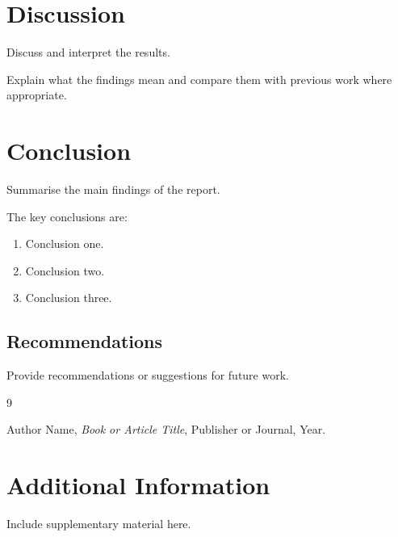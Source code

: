 \documentclass[12pt,a4paper]{report}
\begin{document}
\chapter{Discussion}

Discuss and interpret the results.

Explain what the findings mean and compare them with
previous work where appropriate.

\chapter{Conclusion}

Summarise the main findings of the report.

The key conclusions are:

\begin{enumerate}
    \item Conclusion one.
    \item Conclusion two.
    \item Conclusion three.
\end{enumerate}

\section{Recommendations}

Provide recommendations or suggestions for future work.

\begin{thebibliography}{9}

Author Name,
\textit{Book or Article Title},
Publisher or Journal, Year.

\end{thebibliography}

\appendix

\chapter{Additional Information}

Include supplementary material here.
\end{document}
